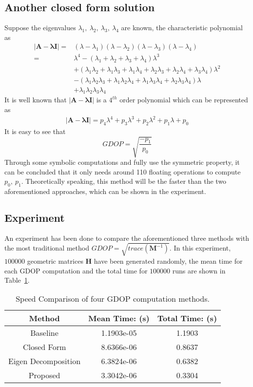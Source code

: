 \documentclass[a4paper]{report}
\begin{document}
\subsection{Another closed form solution}
Suppose the eigenvalues $\lambda_1,\ \lambda_2,\ \lambda_3,\ \lambda_4$ are known, the characteristic polynomial as
\begin{align}
|\mathbf{A-\lambda I}|=&(\lambda-\lambda_1)(\lambda-\lambda_2)(\lambda-\lambda_3)(\lambda-\lambda_4) \nonumber \\
=&\lambda^4-\left(\lambda_1+\lambda_2+\lambda_3+\lambda_4\right)\lambda^3 \nonumber \\
&+(\lambda_1\lambda_2+\lambda_1\lambda_3+\lambda_1\lambda_4+\lambda_2\lambda_3+\lambda_2\lambda_4+\lambda_3\lambda_4)\lambda^2 \nonumber \\
&-(\lambda_1\lambda_2\lambda_3+\lambda_1\lambda_2\lambda_4+\lambda_1\lambda_3\lambda_4+\lambda_2\lambda_3\lambda_4)\lambda \nonumber \\
& + \lambda_1\lambda_2\lambda_3\lambda_4
\end{align}
It is well known that $|\mathbf{A-\lambda I}|$ is a $4^{th}$ order polynomial which can be represented as 
\begin{align}
|\mathbf{A-\lambda I}|=p_4\lambda^4+p_3\lambda^3+p_2\lambda^2+p_1\lambda+p_0
\end{align}
It is easy to see that 
\begin{equation}
GDOP=\sqrt{\frac{-p_1}{p_0}}
\end{equation}
Through some symbolic computations and fully use the symmetric property, it can be concluded that it only needs around 110 floating operations to compute $p_0,\ p_1$. Theoretically speaking, this method will be the faster than the two aforementioned approaches, which can be shown in the experiment.

\subsection{Experiment}
An experiment has been done to compare the aforementioned three methods with the most traditional method $GDOP = \sqrt{trace(\mathbf{M}^{-1})}$. In this experiment, $100000$ geometric matrices $\mathbf{H}$ have been generated randomly, the mean time for each GDOP computation and the total time for $100000$ runs are shown in Table~\ref{tb:com}.
\begin{table}[h]
\centering
\caption{Speed Comparison of four GDOP computation methods.}
\label{tb:com}
\begin{tabular}{c|c|c}
\hline 
\textbf{Method} & \textbf{Mean Time: (s)} & \textbf{Total Time: (s)} \\ \hline 
Baseline & 1.1903e-05 & 1.1903 \\ \hline 
Closed Form & 8.6366e-06 & 0.8637 \\ \hline 
Eigen Decomposition & 6.3824e-06 & 0.6382 \\ \hline 
Proposed & 3.3042e-06 & 0.3304 \\ \hline 
\end{tabular}
\end{table}
\end{document}
